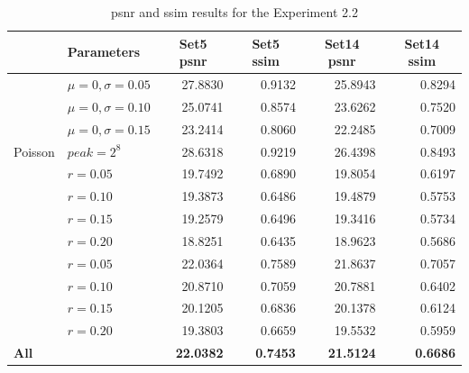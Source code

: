\begin{table}[]
	\centering
	\begin{tabular}{|l|l|r|r|r|r|}
		\hline
		\rowcolor[HTML]{EFEFEF} 
		\multicolumn{1}{|c|}{\cellcolor[HTML]{EFEFEF}\textbf{Noise}} & \textbf{Parameters} & \multicolumn{1}{c|}{\cellcolor[HTML]{EFEFEF}\textbf{Set5 \gls{psnr}}} & \multicolumn{1}{c|}{\cellcolor[HTML]{EFEFEF}\textbf{Set5 \gls{ssim}}} & \multicolumn{1}{c|}{\cellcolor[HTML]{EFEFEF}\textbf{Set14 \gls{psnr}}} & \multicolumn{1}{c|}{\cellcolor[HTML]{EFEFEF}\textbf{Set14 \gls{ssim}}} \\ \hline
		\rowcolor[HTML]{FFFFFF} 
		\cellcolor[HTML]{EFEFEF} & $\mu=0, \sigma=0.05$ & 27.8830 & 0.9132 & 25.8943 & 0.8294 \\
		\rowcolor[HTML]{EFEFEF} 
		\cellcolor[HTML]{EFEFEF} & $\mu=0, \sigma=0.10$ & 25.0741 & 0.8574 & 23.6262 & 0.7520 \\
		\rowcolor[HTML]{FFFFFF} 
		\multirow{-3}{*}{\cellcolor[HTML]{EFEFEF}Gaussian} & $\mu=0, \sigma=0.15$ & 23.2414 & 0.8060 & 22.2485 & 0.7009 \\
		\rowcolor[HTML]{EFEFEF} 
		Poisson & $peak=2^8$ & 28.6318 & 0.9219 & 26.4398 & 0.8493 \\
		\rowcolor[HTML]{FFFFFF} 
		\cellcolor[HTML]{EFEFEF} & $r=0.05$ & 19.7492 & 0.6890 & 19.8054 & 0.6197 \\
		\rowcolor[HTML]{EFEFEF} 
		\cellcolor[HTML]{EFEFEF} & $r=0.10$ & 19.3873 & 0.6486 & 19.4879 & 0.5753 \\
		\rowcolor[HTML]{FFFFFF} 
		\cellcolor[HTML]{EFEFEF} & $r=0.15$ & 19.2579 & 0.6496 & 19.3416 & 0.5734 \\
		\rowcolor[HTML]{EFEFEF} 
		\multirow{-4}{*}{\cellcolor[HTML]{EFEFEF}Salt-and-pepper} & $r=0.20$ & 18.8251 & 0.6435 & 18.9623 & 0.5686 \\
		\rowcolor[HTML]{FFFFFF} 
		\cellcolor[HTML]{EFEFEF} & $r=0.05$ & 22.0364 & 0.7589 & 21.8637 & 0.7057 \\
		\rowcolor[HTML]{EFEFEF} 
		\cellcolor[HTML]{EFEFEF} & $r=0.10$ & 20.8710 & 0.7059 & 20.7881 & 0.6402 \\
		\rowcolor[HTML]{FFFFFF} 
		\cellcolor[HTML]{EFEFEF} & $r=0.15$ & 20.1205 & 0.6836 & 20.1378 & 0.6124 \\
		\rowcolor[HTML]{EFEFEF} 
		\multirow{-4}{*}{\cellcolor[HTML]{EFEFEF}Uniform} & $r=0.20$ & 19.3803 & 0.6659 & 19.5532 & 0.5959 \\
		\rowcolor[HTML]{FFFFFF} 
		\textbf{All} &  & \textbf{22.0382} & \textbf{0.7453} & \textbf{21.5124} & \textbf{0.6686}\\\hline
	\end{tabular}
	\caption{\gls{psnr} and \gls{ssim} results for the Experiment 2.2}
	\label{tab:experiment22}
\end{table}

